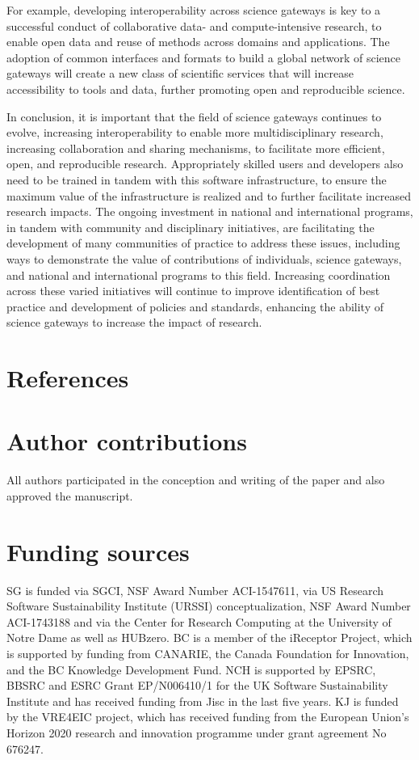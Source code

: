 \documentclass[review]{elsarticle}
\begin{document}
For example, developing interoperability across science gateways is key to a successful conduct of collaborative data- and compute-intensive research, to enable open data and reuse of methods across domains and applications. 
The adoption of common interfaces and formats to build a global network of science gateways will create a new class of scientific services that will increase accessibility to tools and data,  further promoting open and reproducible science. 


In conclusion, it is important that the field of science gateways continues to evolve, increasing interoperability to enable more multidisciplinary research, increasing collaboration and sharing mechanisms, to facilitate more efficient, open, and reproducible research. 
Appropriately skilled users and developers also need to be trained in tandem with this software infrastructure, to ensure the maximum value of the infrastructure is realized and to further facilitate increased research impacts. 
The ongoing investment in national and international programs, in tandem with community and disciplinary initiatives, are facilitating the development of many communities of practice to address these issues, including ways to demonstrate the value of contributions of individuals, science gateways, and national and international programs to this field. Increasing coordination across these varied initiatives will continue to improve identification of best practice and development of policies and standards, enhancing the ability of science gateways to increase the impact of research.


\section*{References}



\section*{Author contributions}
All authors participated in the conception and writing of the paper and also approved the manuscript.

\section*{Funding sources} 
SG is funded via SGCI, NSF Award Number ACI-1547611, via US Research Software Sustainability Institute (URSSI) conceptualization, NSF Award Number ACI-1743188 and via the Center for Research Computing at the University of Notre Dame as well as HUBzero.
BC is a member of the iReceptor Project, which is supported by funding from CANARIE, the Canada Foundation for Innovation, and the BC Knowledge Development Fund.
NCH is supported by EPSRC, BBSRC and ESRC Grant EP/N006410/1 for the UK Software Sustainability Institute and has received funding from Jisc in the last five years.
KJ is funded by the VRE4EIC project, which has received funding from the European Union’s Horizon 2020 research and innovation programme under grant agreement No 676247.
\end{document}

